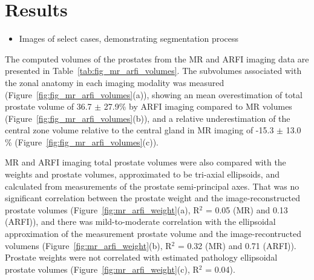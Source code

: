 \section{Results}\label{sect:results}

\begin{itemize}
    \item Images of select cases, demonstrating segmentation process
\end{itemize}

The computed volumes of the prostates from the MR and ARFI imaging data are
presented in Table~\ref{tab:fig_mr_arfi_volumes}.  The subvolumes associated
with the zonal anatomy in each imaging modality was measured
(Figure~\ref{fig:fig_mr_arfi_volumes}(a)), showing an mean overestimation of
total prostate volume of 36.7 $\pm$ 27.9\% by ARFI imaging compared to MR
volumes (Figure~\ref{fig:fig_mr_arfi_volumes}(b)), and a relative
underestimation of the central zone volume relative to the central gland in MR
imaging of -15.3 $\pm$ 13.0 \% (Figure~\ref{fig:fig_mr_arfi_volumes}(c)).





MR and ARFI imaging total prostate volumes were also compared with the weights
and prostate volumes, approximated to be tri-axial ellipsoids, and calculated
from measurements of the prostate semi-principal axes.  That was no significant
correlation between the prostate weight and the image-reconstructed prostate
volumes (Figure~\ref{fig:mr_arfi_weight}(a), R$^2$ = 0.05 (MR) and 0.13
(ARFI)), and there was mild-to-moderate correlation with the ellipsoidal
approximation of the measurement prostate volume and the image-recontructed
volumens (Figure~\ref{fig:mr_arfi_weight}(b), R$^2$ = 0.32 (MR) and 0.71
(ARFI)).  Prostate weights were not correlated with estimated pathology
ellipsoidal prostate volumes (Figure~\ref{fig:mr_arfi_weight}(c), R$^2$ =
0.04). 




